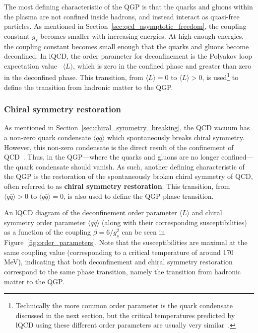 The most defining characteristic of the QGP is that the quarks and gluons within the plasma are not confined inside hadrons, and instead interact as quasi-free particles. As mentioned in Section~\ref{sec:qcd_asymptotic_freedom}, the coupling constant $g_s$ becomes smaller with increasing energies. At high enough energies, the coupling constant becomes small enough that the quarks and gluons become deconfined. In lQCD, the order parameter for deconfinement is the Polyakov loop expectation value~\cite{PolyakovLoop} $\langle L \rangle$, which is zero in the confined phase and greater than zero in the deconfined phase. This transition, from $\langle L \rangle = 0$ to $\langle L \rangle > 0$, is used\footnote{Technically the more common order parameter is the quark condensate discussed in the next section, but the critical temperatures predicted by lQCD using these different order parameters are usually very similar~\cite{QCDOrderParameterSimilarity}.} to define the transition from hadronic matter to the QGP. 


\subsubsection{Chiral symmetry restoration}

As mentioned in Section~\ref{sec:chiral_symmetry_breaking}, the QCD vacuum has a non-zero quark condensate $\langle q\bar{q} \rangle$ which spontaneously breaks chiral symmetry. However, this non-zero condensate is the direct result of the confinement of QCD~\cite{TongGauge}. Thus, in the QGP---where the quarks and gluons are no longer confined---the quark condensate should vanish. As such, another defining characteristic of the QGP is the restoration of the spontaneously broken chiral symmetry of QCD, often referred to as \textbf{chiral symmetry restoration}. This transition, from $\langle q\bar{q} \rangle > 0$ to $\langle q\bar{q} \rangle = 0$, is also used to define the QGP phase transition. 

An lQCD diagram of the deconfinement order parameter $\langle L \rangle$ and chiral symmetry order parameter $\langle q\bar{q} \rangle$ (along with their corresponding susceptibilities) as a function of the coupling $\beta = 6/g_s^2$ can be seen in Figure~\ref{fig:order_parameters}. Note that the susceptibilities are maximal at the same coupling value (corresponding to a critical temperature of around 170 MeV), indicating that both deconfinement and chiral symmetry restoration correspond to the same phase transition, namely the transition from hadronic matter to the QGP.

